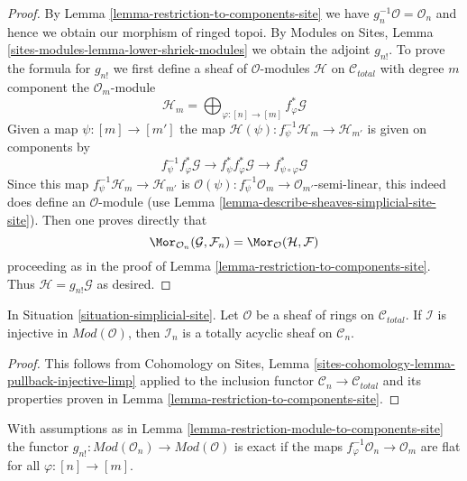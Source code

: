 \begin{proof}
By Lemma \ref{lemma-restriction-to-components-site} we have
$g_n^{-1}\mathcal{O} = \mathcal{O}_n$ and hence we obtain our
morphism of ringed topoi. By Modules on Sites, Lemma
\ref{sites-modules-lemma-lower-shriek-modules}
we obtain the adjoint $g_{n!}$. To prove the formula for $g_{n!}$
we first define a sheaf of $\mathcal{O}$-modules $\mathcal{H}$
on $\mathcal{C}_{total}$ with degree $m$ component
the $\mathcal{O}_m$-module
$$
\mathcal{H}_m =
\bigoplus\nolimits_{\varphi : [n] \to [m]} f_\varphi^*\mathcal{G}
$$
Given a map $\psi : [m] \to [m']$ the map
$\mathcal{H}(\psi) : f_\psi^{-1}\mathcal{H}_m \to \mathcal{H}_{m'}$
is given on components by
$$
f_\psi^{-1} f_\varphi^*\mathcal{G} \to
f_\psi^* f_\varphi^*\mathcal{G} \to
f_{\psi \circ \varphi}^*\mathcal{G}
$$
Since this map $f_\psi^{-1}\mathcal{H}_m \to \mathcal{H}_{m'}$ is
$\mathcal{O}(\psi) : f_\psi^{-1}\mathcal{O}_m \to \mathcal{O}_{m'}$-semi-linear,
this indeed does define an $\mathcal{O}$-module
(use Lemma \ref{lemma-describe-sheaves-simplicial-site-site}).
Then one proves directly that
$$
\Mor_{\mathcal{O}_n}(\mathcal{G}, \mathcal{F}_n) =
\Mor_{\mathcal{O}}(\mathcal{H}, \mathcal{F})
$$
proceeding as in the proof of Lemma \ref{lemma-restriction-to-components-site}.
Thus $\mathcal{H} = g_{n!}\mathcal{G}$ as desired.
\end{proof}

\begin{lemma}
\label{lemma-restriction-injective-to-component-limp}
In Situation \ref{situation-simplicial-site}.
Let $\mathcal{O}$ be a sheaf of rings on $\mathcal{C}_{total}$.
If $\mathcal{I}$ is injective in $\textit{Mod}(\mathcal{O})$, then
$\mathcal{I}_n$ is a totally acyclic sheaf on $\mathcal{C}_n$.
\end{lemma}

\begin{proof}
This follows from
Cohomology on Sites, Lemma \ref{sites-cohomology-lemma-pullback-injective-limp}
applied to the inclusion functor $\mathcal{C}_n \to \mathcal{C}_{total}$
and its properties proven in Lemma \ref{lemma-restriction-to-components-site}.
\end{proof}

\begin{lemma}
\label{lemma-exactness-g-shriek-modules}
With assumptions as in
Lemma \ref{lemma-restriction-module-to-components-site} the functor
$g_{n!} : \textit{Mod}(\mathcal{O}_n) \to \textit{Mod}(\mathcal{O})$
is exact if the maps $f_\varphi^{-1}\mathcal{O}_n \to \mathcal{O}_m$
are flat for all $\varphi : [n] \to [m]$.
\end{lemma}

